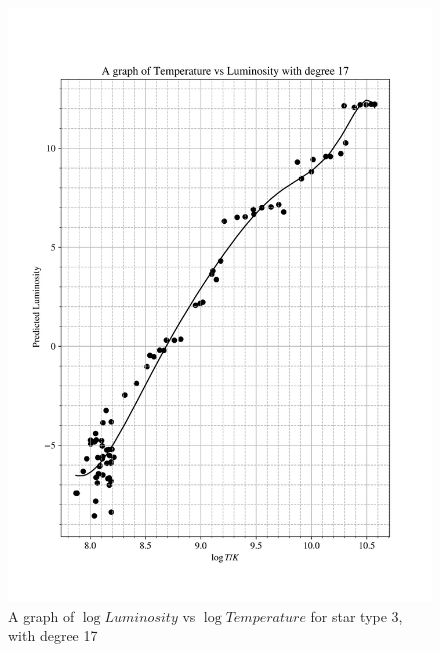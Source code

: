 \documentclass[12pt, a4paper]{article}
\begin{document}
\begin{figure}[H]
    \centering
    \includegraphics[width = \textwidth]{2Plot4_17.png}
    \caption{A graph of \(\log{Luminosity}\) vs \(\log{Temperature}\) for star type 3, with degree 17}
    \label{fig:Fig 2.8}
\end{figure}
\end{document}
